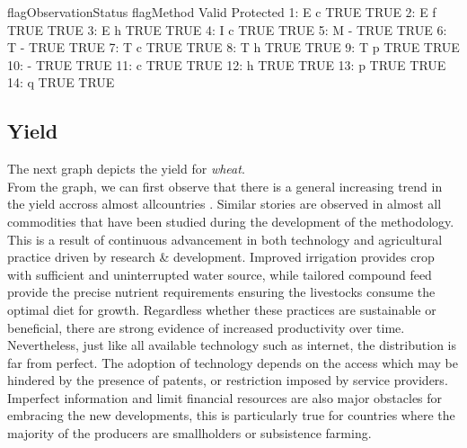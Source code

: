 \documentclass[nojss]{jss}
\begin{document}
\newpage

\begin{Schunk}
\begin{Soutput}
    flagObservationStatus flagMethod Valid Protected
 1:                     E          c  TRUE      TRUE
 2:                     E          f  TRUE      TRUE
 3:                     E          h  TRUE      TRUE
 4:                     I          c  TRUE      TRUE
 5:                     M          -  TRUE      TRUE
 6:                     T          -  TRUE      TRUE
 7:                     T          c  TRUE      TRUE
 8:                     T          h  TRUE      TRUE
 9:                     T          p  TRUE      TRUE
10:                                -  TRUE      TRUE
11:                                c  TRUE      TRUE
12:                                h  TRUE      TRUE
13:                                p  TRUE      TRUE
14:                                q  TRUE      TRUE
\end{Soutput}
\end{Schunk}






\subsection{Yield}

The next graph depicts the yield for \textit{wheat}.\\

From the graph, we can first observe that there is a general
increasing trend in the yield accross almost allcountries .
Similar stories are observed in almost all commodities
that have been studied during the development of the methodology. This
is a result of continuous advancement in both technology and
agricultural practice driven by research \& development. Improved
irrigation provides crop with sufficient and uninterrupted water
source, while tailored compound feed provide the precise nutrient
requirements ensuring the livestocks consume the optimal diet for
growth. Regardless whether these practices are sustainable or
beneficial, there are strong evidence of increased productivity over
time.\\

Nevertheless, just like all available technology such as internet, the
distribution is far from perfect. The adoption of technology depends
on the access which may be hindered by the presence of patents, or
restriction imposed by service providers. Imperfect information and
limit financial resources are also major obstacles for embracing the
new developments, this is particularly true for countries where the
majority of the producers are smallholders or subsistence farming.\\
\end{document}
